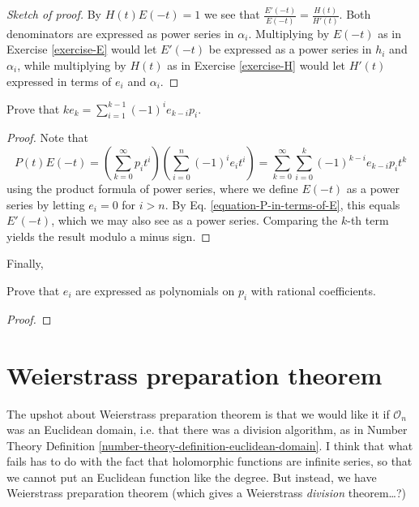 \begin{proof}[Sketch of proof]
By $H(t)E(-t)=1$ we see that $\frac{E'(-t)}{E(-t)}=\frac{H(t)}{H'(t)}$. Both
denominators are expressed as power series in $\alpha_i$. Multiplying by $E(-t)$
as in Exercise \ref{exercise-E} 
would let $E'(-t)$ be expressed as a power series in $h_i$ and
$\alpha_i$, while multiplying by $H(t)$ as in Exercise \ref{exercise-H} would 
let $H'(t)$ expressed in terms of
$e_i$ and $\alpha_i$.
\end{proof}

\begin{exercise}
\label{exercise-Newton-formula}
Prove that $ke_k=\sum_{i=1}^{k-1}(-1)^ie_{k-i}p_i$.
\end{exercise}

\begin{proof}
Note that
$$
P(t)E(-t)=\left(\sum_{k=0}^{\infty} p_it^i\right)
\left(\sum_{i=0}^n(-1)^ie_it^i\right)
=\sum_{k=0}^\infty \sum_{i=0}^k (-1)^{k-i}e_{k-i}p_it^k
$$
using the product formula of power series, where we define $E(-t)$ as a power
series by letting $e_i=0$ for $i>n$. By Eq. \ref{equation-P-in-terms-of-E}, this
equals $E'(-t)$, which we may also see as a power series. Comparing the $k$-th
term yields the result modulo a minus sign.
\end{proof}

\noindent
Finally,

\begin{exercise}
\label{exercise-symmetric-polynomials-in-terms-of-Newton-polynomials}
Prove that $e_i$ are expressed as polynomials on $p_i$ with rational
coefficients.
\end{exercise}

\begin{proof}

\end{proof}

\section{Weierstrass preparation theorem}
\label{section-weierstrass-preparation-theorem}

\noindent
The upshot about Weierstrass preparation theorem is that
we would like it if $\mathcal{O}_n$ was an Euclidean domain,
i.e. that there was a division algorithm, 
as in Number Theory Definition \ref{number-theory-definition-euclidean-domain}.
I think that what fails has to do with the fact
that holomorphic functions are infinite series,
so that we cannot put an Euclidean function like the degree.
But instead, we have Weierstrass preparation theorem
(which gives a Weierstrass {\it division} theorem…?)

